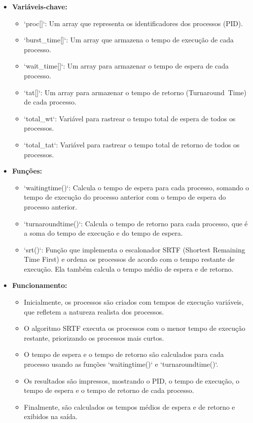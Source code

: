 \documentclass[
	12pt,				%
	openright,			%
	oneside,			%
	a4paper,			%
	chapter=TITLE,		%
	english,			%
	french,				%
	spanish,			%
	brazil				%
	]{abntex2}
\theoremstyle{definition}
\begin{document}
\begin{itemize}
    \item \textbf{Variáveis-chave:}
      \begin{itemize}
        \item `proc[]`: Um array que representa os identificadores dos processos (PID).
        \item `burst\_time[]`: Um array que armazena o tempo de execução de cada processo.
        \item `wait\_time[]`: Um array para armazenar o tempo de espera de cada processo.
        \item `tat[]`: Um array para armazenar o tempo de retorno (Turnaround\ Time) de cada processo.
        \item `total\_wt`: Variável para rastrear o tempo total de espera de todos os processos.
        \item `total\_tat`: Variável para rastrear o tempo total de retorno de todos os processos.
      \end{itemize}
  
    \item \textbf{Funções:}
      \begin{itemize}
        \item `waitingtime()`: Calcula o tempo de espera para cada processo, somando o tempo de execução do processo anterior com o tempo de espera do processo anterior.
        \item `turnaroundtime()`: Calcula o tempo de retorno para cada processo, que é a soma do tempo de execução e do tempo de espera.
        \item `srt()`: Função que implementa o escalonador SRTF (Shortest Remaining Time First) e ordena os processos de acordo com o tempo restante de execução. Ela também calcula o tempo médio de espera e de retorno.
      \end{itemize}
  
    \item \textbf{Funcionamento:}
      \begin{itemize}
        \item Inicialmente, os processos são criados com tempos de execução variáveis, que refletem a natureza realista dos processos.
        \item O algoritmo SRTF executa os processos com o menor tempo de execução restante, priorizando os processos mais curtos.
        \item O tempo de espera e o tempo de retorno são calculados para cada processo usando as funções `waitingtime()` e `turnaroundtime()`.
        \item Os resultados são impressos, mostrando o PID, o tempo de execução, o tempo de espera e o tempo de retorno de cada processo.
        \item Finalmente, são calculados os tempos médios de espera e de retorno e exibidos na saída.
      \end{itemize}
  \end{itemize}
\end{document}
